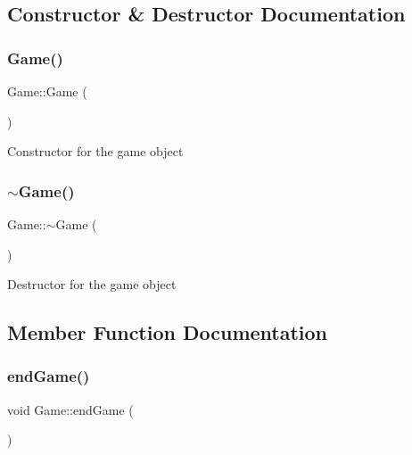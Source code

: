 \subsection{Constructor \& Destructor Documentation}
\mbox{\label{class_game_ad59df6562a58a614fda24622d3715b65}} 
\subsubsection{\texorpdfstring{Game()}{Game()}}
{\footnotesize\ttfamily Game\+::\+Game (\begin{DoxyParamCaption}{ }\end{DoxyParamCaption})}



Constructor for the game object 

\mbox{\label{class_game_ae3d112ca6e0e55150d2fdbc704474530}} 
\subsubsection{\texorpdfstring{$\sim$Game()}{~Game()}}
{\footnotesize\ttfamily Game\+::$\sim$\+Game (\begin{DoxyParamCaption}{ }\end{DoxyParamCaption})}



Destructor for the game object 



\subsection{Member Function Documentation}
\mbox{\label{class_game_a7d88788cf4b0da39a0245d418aa6f37a}} 
\subsubsection{\texorpdfstring{endGame()}{endGame()}}
{\footnotesize\ttfamily void Game\+::end\+Game (\begin{DoxyParamCaption}{ }\end{DoxyParamCaption})}



